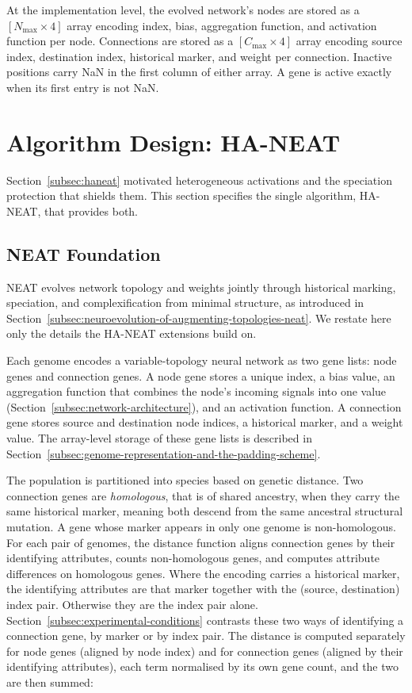 At the implementation level, the evolved network's nodes are stored as a $[N_{\max} \times 4]$ array encoding index, bias, aggregation function, and activation function per node.
Connections are stored as a $[C_{\max} \times 4]$ array encoding source index, destination index, historical marker, and weight per connection.
Inactive positions carry NaN in the first column of either array. A gene is active exactly when its first entry is not NaN.


\section{Algorithm Design: HA-NEAT}
\label{subsec:algorithm-design-ha-neat}

Section~\ref{subsec:haneat} motivated heterogeneous activations and the speciation protection that shields them. This section specifies the single algorithm, HA-NEAT, that provides both.

\subsection{NEAT Foundation}
\label{subsubsec:neat-foundation}

NEAT evolves network topology and weights jointly through historical marking, speciation, and complexification from minimal structure, as introduced in Section~\ref{subsec:neuroevolution-of-augmenting-topologies-neat}.
We restate here only the details the HA-NEAT extensions build on.

Each genome encodes a variable-topology neural network as two gene lists: node genes and connection genes.
A node gene stores a unique index, a bias value, an aggregation function that combines the node's incoming signals into one value (Section~\ref{subsec:network-architecture}), and an activation function.
A connection gene stores source and destination node indices, a historical marker, and a weight value.
The array-level storage of these gene lists is described in Section~\ref{subsec:genome-representation-and-the-padding-scheme}.

The population is partitioned into species based on genetic distance.
Two connection genes are \emph{homologous}, that is of shared ancestry, when they carry the same historical marker, meaning both descend from the same ancestral structural mutation. A gene whose marker appears in only one genome is non-homologous.
For each pair of genomes, the distance function aligns connection genes by their identifying attributes, counts non-homologous genes, and computes attribute differences on homologous genes.
Where the encoding carries a historical marker, the identifying attributes are that marker together with the (source, destination) index pair. Otherwise they are the index pair alone. Section~\ref{subsec:experimental-conditions} contrasts these two ways of identifying a connection gene, by marker or by index pair.
The distance is computed separately for node genes (aligned by node index) and for connection genes (aligned by their identifying attributes), each term normalised by its own gene count, and the two are then summed:

